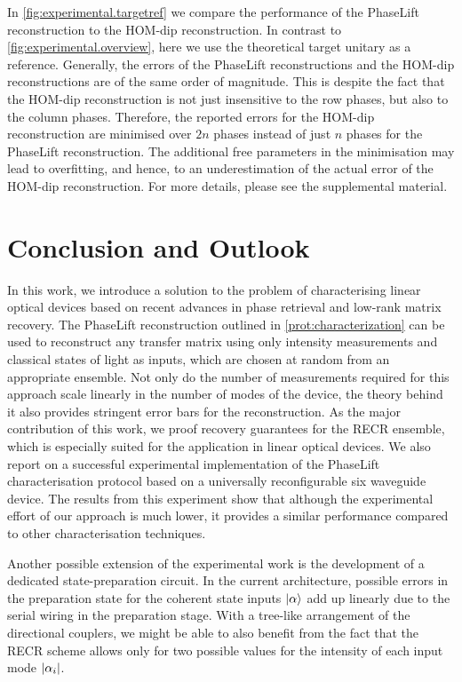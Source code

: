 In \cref{fig:experimental.targetref} we compare the performance of the PhaseLift reconstruction to the HOM-dip reconstruction.
In contrast to \cref{fig:experimental.overview}, here we use the theoretical target unitary as a reference.
Generally, the errors of the PhaseLift reconstructions and the HOM-dip reconstructions are of the same order of magnitude.
This is despite the fact that the HOM-dip reconstruction is not just insensitive to the row phases, but also to the column phases.
Therefore, the reported errors for the HOM-dip reconstruction are minimised over $2n$ phases instead of just $n$ phases for the PhaseLift reconstruction.
The additional free parameters in the minimisation may lead to overfitting, and hence, to an underestimation of the actual error of the HOM-dip reconstruction.
For more details, please see the supplemental material.


\section{Conclusion and Outlook}

In this work, we introduce a solution to the problem of characterising linear optical devices based on recent advances in phase retrieval and low-rank matrix recovery.
The PhaseLift reconstruction outlined in \cref{prot:characterization} can be used to reconstruct any transfer matrix using only intensity measurements and classical states of light as inputs, which are chosen at random from an appropriate ensemble.
Not only do the number of measurements required for this approach scale linearly in the number of modes of the device, the theory behind it also provides stringent error bars for the reconstruction.
As the major contribution of this work, we proof recovery guarantees for the RECR ensemble, which is especially suited for the application in linear optical devices.
We also report on a successful experimental implementation of the PhaseLift characterisation protocol based on a universally reconfigurable six waveguide device.
The results from this experiment show that although the experimental effort of our approach is much lower, it provides a similar performance compared to other characterisation techniques.

Another possible extension of the experimental work is the development of a dedicated state-preparation circuit.
In the current architecture, possible errors in the preparation state for the coherent state inputs $\ket{\alpha}$ add up linearly due to the serial wiring in the preparation stage.
With a tree-like arrangement of the directional couplers, we might be able to also benefit from the fact that the RECR scheme allows only for two possible values for the intensity of each input mode ${\vert\alpha_i\vert}$.
